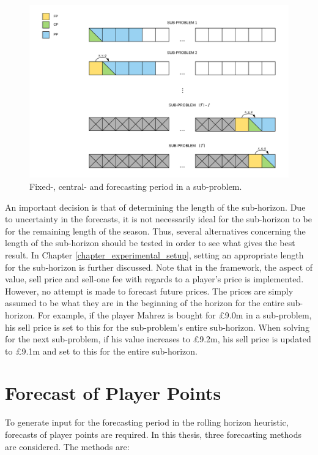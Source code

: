 \begin{figure}[H]
    \centering
    \includegraphics[scale = 0.47]{fig/chapter_5/rolling_horizon.png}
    \caption{Fixed-, central- and forecasting period in a sub-problem.}
    \label{fig:rolling_horizon}
\end{figure}

\newpar

An important decision is that of determining the length of the sub-horizon. Due to uncertainty in the forecasts, it is not necessarily ideal for the sub-horizon to be for the remaining length of the season. Thus, several alternatives concerning the length of the sub-horizon should be tested in order to see what gives the best result. In Chapter \ref{chapter_experimental_setup}, setting an appropriate length for the sub-horizon is further discussed. Note that in the framework, the aspect of value, sell price and sell-one fee with regards to a player's price is implemented. However, no attempt is made to forecast future prices. The prices are simply assumed to be what they are in the beginning of the horizon for the entire sub-horizon. For example, if the player Mahrez is bought for \pounds 9.0m in a sub-problem, his sell price is set to this for the sub-problem's entire sub-horizon. When solving for the next sub-problem, if his value increases to \pounds 9.2m, his sell price is updated to \pounds 9.1m and set to this for the entire sub-horizon. 

\section{Forecast of Player Points} \label{Player_Performance}

To generate input for the forecasting period in the rolling horizon heuristic, forecasts of player points are required. In this thesis, three forecasting methods are considered. The methods are: 

